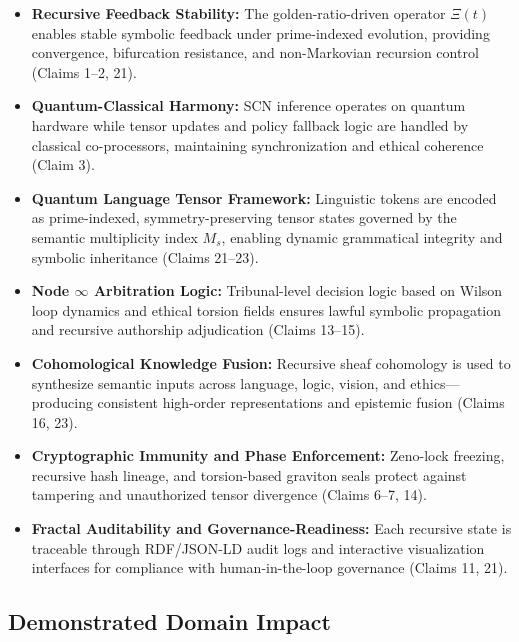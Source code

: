 \documentclass[12pt]{article}
\begin{document}
\begin{itemize}
    \item \textbf{Recursive Feedback Stability:} The golden-ratio-driven operator \( \Xi(t) \) enables stable symbolic feedback under prime-indexed evolution, providing convergence, bifurcation resistance, and non-Markovian recursion control (Claims 1–2, 21).

    \item \textbf{Quantum-Classical Harmony:} SCN inference operates on quantum hardware while tensor updates and policy fallback logic are handled by classical co-processors, maintaining synchronization and ethical coherence (Claim 3).

    \item \textbf{Quantum Language Tensor Framework:} Linguistic tokens are encoded as prime-indexed, symmetry-preserving tensor states governed by the semantic multiplicity index \( M_s \), enabling dynamic grammatical integrity and symbolic inheritance (Claims 21–23).

    \item \textbf{Node \( \infty \) Arbitration Logic:} Tribunal-level decision logic based on Wilson loop dynamics and ethical torsion fields ensures lawful symbolic propagation and recursive authorship adjudication (Claims 13–15).

    \item \textbf{Cohomological Knowledge Fusion:} Recursive sheaf cohomology is used to synthesize semantic inputs across language, logic, vision, and ethics—producing consistent high-order representations and epistemic fusion (Claims 16, 23).

    \item \textbf{Cryptographic Immunity and Phase Enforcement:} Zeno-lock freezing, recursive hash lineage, and torsion-based graviton seals protect against tampering and unauthorized tensor divergence (Claims 6–7, 14).

    \item \textbf{Fractal Auditability and Governance-Readiness:} Each recursive state is traceable through RDF/JSON-LD audit logs and interactive visualization interfaces for compliance with human-in-the-loop governance (Claims 11, 21).
\end{itemize}

\subsection*{Demonstrated Domain Impact}
\end{document}
